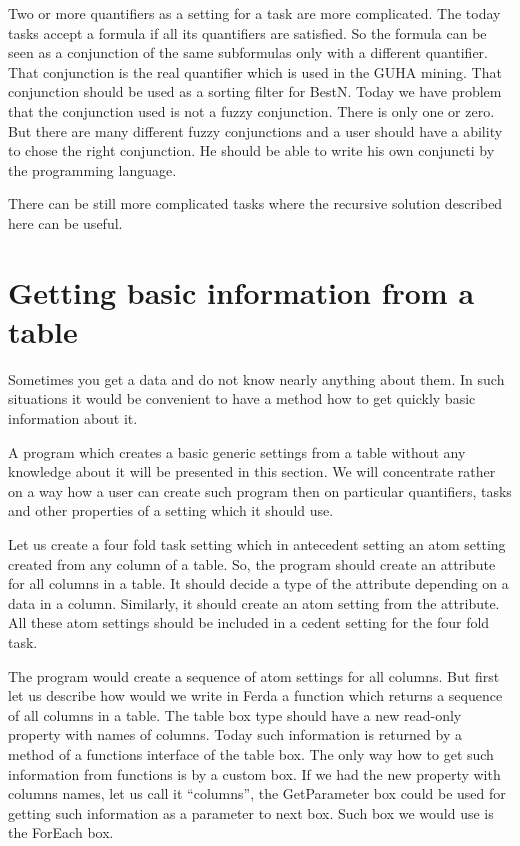 \documentclass[a4paper,12pt]{book}
\begin{document}
Two or more quantifiers as a setting for a task are more complicated. The today tasks accept a formula if all its quantifiers are satisfied. So the formula can be seen as a conjunction of the same subformulas only with a different quantifier. That conjunction is the real quantifier which is used in the GUHA mining. That conjunction should be used as a sorting filter for BestN. Today we have problem that the conjunction used is not a fuzzy conjunction. There is only one or zero. But there are many different fuzzy conjunctions and a user should have a ability to chose the right conjunction. He should be able to write his own conjuncti by the programming language.

There can be still more complicated tasks where the recursive solution described here can be useful.

\section{Getting basic information from a table}
Sometimes you get a data and do not know nearly anything about them. In such situations it would be convenient to have a method how to get quickly basic information about it.

A program which creates a basic generic settings from a table without any knowledge about it will be presented in this section. We will concentrate rather on a way how a user can create such program then on particular quantifiers, tasks and other properties of a setting which it should use.

Let us create a four fold task setting which in antecedent setting an atom setting created from any column of a table. So, the program should create an attribute for all columns in a table. It should decide a type of the attribute depending on a data in a column. Similarly, it should create an atom setting from the attribute. All these atom settings should be included in a cedent setting for the four fold task.

The program would create a sequence of atom settings for all columns. But first let us describe how would we write in Ferda a function which returns a sequence of all columns in a table. The table box type should have a new read-only property with names of columns. Today such information is returned by a method of a functions interface of the table box. The only way how to get such information from functions is by a custom box. If we had the new property with columns names, let us call it ``columns'', the GetParameter box could be used for getting such information as a parameter to next box. Such box we would use is the ForEach box.
\end{document}
